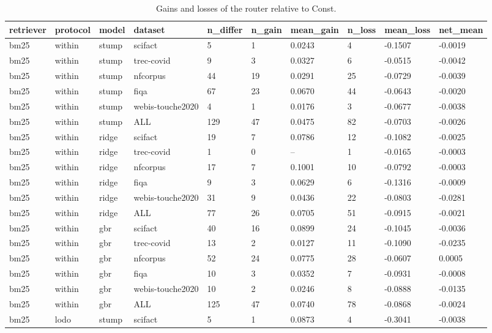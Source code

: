 \begin{table}[t]\centering\small
\caption{Gains and losses of the router relative to Const.}\label{tab:c3}
\begin{tabular}{llllllllll}
\toprule
retriever & protocol & model & dataset & n\_differ & n\_gain & mean\_gain & n\_loss & mean\_loss & net\_mean \\
\midrule
bm25 & within & stump & scifact & 5 & 1 & 0.0243 & 4 & -0.1507 & -0.0019 \\
bm25 & within & stump & trec-covid & 9 & 3 & 0.0327 & 6 & -0.0515 & -0.0042 \\
bm25 & within & stump & nfcorpus & 44 & 19 & 0.0291 & 25 & -0.0729 & -0.0039 \\
bm25 & within & stump & fiqa & 67 & 23 & 0.0670 & 44 & -0.0643 & -0.0020 \\
bm25 & within & stump & webis-touche2020 & 4 & 1 & 0.0176 & 3 & -0.0677 & -0.0038 \\
bm25 & within & stump & ALL & 129 & 47 & 0.0475 & 82 & -0.0703 & -0.0026 \\
bm25 & within & ridge & scifact & 19 & 7 & 0.0786 & 12 & -0.1082 & -0.0025 \\
bm25 & within & ridge & trec-covid & 1 & 0 & -- & 1 & -0.0165 & -0.0003 \\
bm25 & within & ridge & nfcorpus & 17 & 7 & 0.1001 & 10 & -0.0792 & -0.0003 \\
bm25 & within & ridge & fiqa & 9 & 3 & 0.0629 & 6 & -0.1316 & -0.0009 \\
bm25 & within & ridge & webis-touche2020 & 31 & 9 & 0.0436 & 22 & -0.0803 & -0.0281 \\
bm25 & within & ridge & ALL & 77 & 26 & 0.0705 & 51 & -0.0915 & -0.0021 \\
bm25 & within & gbr & scifact & 40 & 16 & 0.0899 & 24 & -0.1045 & -0.0036 \\
bm25 & within & gbr & trec-covid & 13 & 2 & 0.0127 & 11 & -0.1090 & -0.0235 \\
bm25 & within & gbr & nfcorpus & 52 & 24 & 0.0775 & 28 & -0.0607 & 0.0005 \\
bm25 & within & gbr & fiqa & 10 & 3 & 0.0352 & 7 & -0.0931 & -0.0008 \\
bm25 & within & gbr & webis-touche2020 & 10 & 2 & 0.0246 & 8 & -0.0888 & -0.0135 \\
bm25 & within & gbr & ALL & 125 & 47 & 0.0740 & 78 & -0.0868 & -0.0024 \\
bm25 & lodo & stump & scifact & 5 & 1 & 0.0873 & 4 & -0.3041 & -0.0038 \\

\end{tabular}
\end{table}

